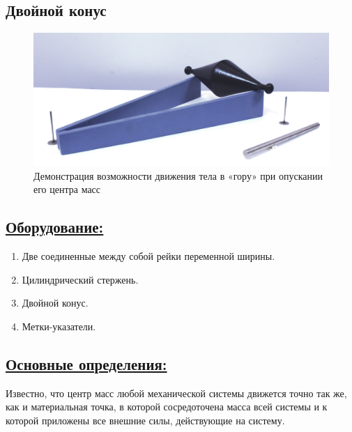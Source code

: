 \documentclass[14pt,a4paper,oneside]{extarticle}	%
\begin{document}
	

	\begin{center}
		\subsection*{Двойной конус}
	\end{center}
	
	\begin{figure}[H] 
		\centering 
		\includegraphics[width=0.9\linewidth]{center-3.png}
		\caption{Демонстрация возможности движения тела в «гору» при опускании его центра масс}
		\label{center-3}
	\end{figure}
	
	\subsection*{\underline{Оборудование:}}
	
	\begin{enumerate} 
		\item Две соединенные между собой рейки переменной ширины.
		\item Цилиндрический стержень.
		\item Двойной конус.
		\item Метки-указатели.
	\end{enumerate}

	\subsection*{\underline{Основные определения:}}
	
	Известно, что центр масс любой механической системы движется точно так же, как и материальная точка, в которой сосредоточена масса всей системы и к которой приложены все внешние силы, действующие на систему.
	
\end{document}
